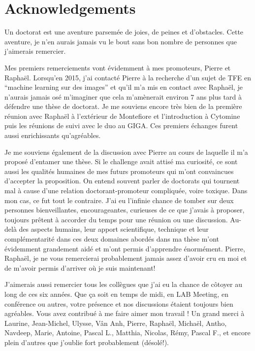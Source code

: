 \chapter*{Acknowledgements}

Un doctorat est une aventure parsemée de joies, de peines et d'obstacles. Cette aventure, je n'en aurais jamais vu le bout sans bon nombre de personnes que j'aimerais remercier. 

\vspace{15pt}

Mes premiers remerciements vont évidemment à mes promoteurs, Pierre et Raphaël. Lorsqu'en 2015, j'ai contacté Pierre à la recherche d'un sujet de TFE en ``machine learning sur des images'' et qu'il m'a mis en contact avec Raphaël, je n'aurais jamais osé m'imaginer que cela m'amènerait environ 7 ans plus tard à défendre une thèse de doctorat. Je me souviens encore très bien de la première réunion avec Raphaël à l'extérieur de Montefiore et l'introduction à Cytomine puis les réunions de suivi avec le duo au GIGA. Ces premiers échanges furent aussi enrichissants qu'agréables.

Je me souviens également de la discussion avec Pierre au cours de laquelle il m'a proposé d'entamer une thèse. Si le challenge avait attisé ma curiosité, ce sont aussi les qualités humaines de mes futurs promoteurs qui m'ont convaincues d'accepter la proposition. On entend souvent parler de doctorats qui tournent mal à cause d'une relation doctorant-promoteur compliquée, voire toxique. Dans mon cas, ce fut tout le contraire. J'ai eu l'infinie chance de tomber sur deux personnes bienveillantes, encourageantes, curieuses de ce que j'avais à proposer, toujours prêtent à accorder du temps pour une réunion ou une discussion. Au-delà des aspects humains, leur apport scientifique, technique et leur complémentarité dans ces deux domaines abordés dans ma thèse m'ont évidemment grandement aidé et m'ont permis d'apprendre énormément. Pierre, Raphaël, je ne vous remercierai probablement jamais assez d'avoir cru en moi et de m'avoir permis d'arriver où je suis maintenant!

\vspace{15pt}

J'aimerais aussi remercier tous les collègues que j'ai eu la chance de côtoyer au long de ces six années. Que ça soit en temps de midi, en LAB Meeting, en conférence ou autres, votre présence et nos discussions étaient toujours bien agréables. Vous avez contribué à me faire aimer mon travail ! Un grand merci à Laurine, Jean-Michel, Ulysse, Vân Anh, Pierre, Raphaël, Michaël, Antho, Navdeep, Marie, Antoine, Pascal L., Matthia, Nicolas, Rémy, Pascal F., et encore plein d'autres que j'oublie fort probablement (désolé!).

